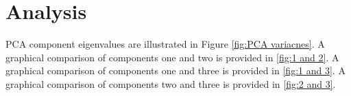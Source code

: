 \documentclass[3p,times]{elsarticle}
\begin{document}
%





\section{Analysis}
\label{sec:analysis}

PCA component eigenvalues are illustrated in Figure \ref{fig:PCA variacnes}. A graphical comparison of components one and two is provided in \ref{fig:1 and 2}. A graphical comparison of components one and three is provided in \ref{fig:1 and 3}. A graphical comparison of components two and three is provided in \ref{fig:2 and 3}.
\end{document}
